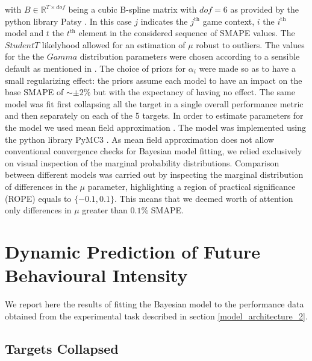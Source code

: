 with $B \in \mathbb{R}^{T \times dof}$ being a cubic B-spline matrix with $dof=6$ as provided by the python library Patsy \cite{patsy}. In this case $j$ indicates the $j^{\text{th}}$ game context, $i$ the $i^{\text{th}}$ model and $t$ the $t^{\text{th}}$ element in the considered sequence of SMAPE values. The $StudentT$ likelyhood allowed for an estimation of $\mu$ robust to outliers. The values for the the $Gamma$ distribution parameters were chosen according to a sensible default as mentioned in \cite{vehtarinu}. The choice of priors for $\alpha_{i}$ were made so as to have a small regularizing effect: the priors assume each model to have an impact on the base SMAPE of $\sim \pm 2\% $ but with the expectancy of having no effect. The same model was fit first collapsing all the target in a single overall performance metric and then separately on each of the 5 targets. In order to estimate parameters for the model we used mean field approximation \cite{kucukelbir2017automatic}. The model was implemented using the python library PyMC3 \cite{salvatier2016probabilistic}. As mean field approximation does not allow conventional convergence checks for Bayesian model fitting, we relied exclusively on visual inspection of the marginal probability distributions. Comparison between different models was carried out by inspecting the marginal distribution of differences in the $\mu$ parameter, highlighting a region of practical significance (ROPE) equals to $\{-0.1, 0.1\}$. This means that we deemed worth of attention only differences in $\mu$ greater than $0.1\%$ SMAPE.

\section{Dynamic Prediction of Future Behavioural Intensity}
\label{dynamic_prediction_ancillary_perf}

We report here the results of fitting the Bayesian model to the performance data obtained from the experimental task described in section \ref{model_architecture_2}.

\subsection{Targets Collapsed}
\label{collapsed_bayes_2}

